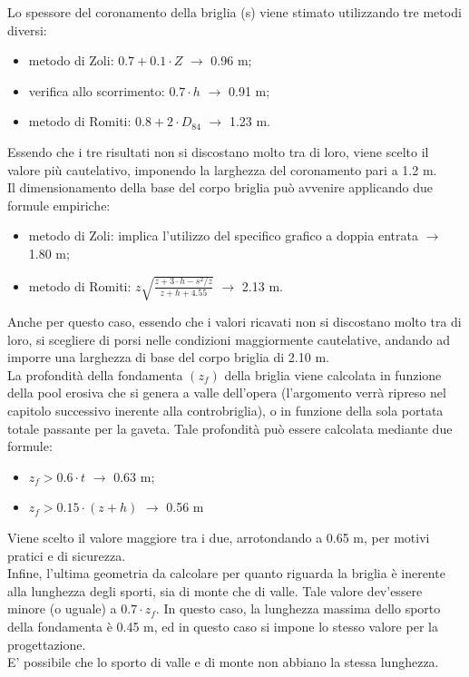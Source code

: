 Lo spessore del coronamento della briglia (s) viene stimato utilizzando tre metodi diversi:
\begin{itemize}
    \item metodo di Zoli: $0.7 + 0.1 \cdot Z$ $\rightarrow$ 0.96 m;
    \item verifica allo scorrimento: $0.7 \cdot h$ $\rightarrow$ 0.91 m;
    \item metodo di Romiti: $0.8 + 2 \cdot D_{84}$ $\rightarrow$ 1.23 m.
\end{itemize}
Essendo che i tre risultati non si discostano molto tra di loro, viene scelto il valore più cautelativo, imponendo la larghezza del coronamento pari a 1.2 m.\\
Il dimensionamento della base del corpo briglia può avvenire applicando due formule empiriche:
\begin{itemize}
    \item metodo di Zoli: implica l'utilizzo del specifico grafico a doppia entrata $\rightarrow$ 1.80 m;
    \item metodo di Romiti: $z \sqrt{\frac{z+3 \cdot h-s^2/z}{z+h+4.55}}$ $\rightarrow$ 2.13 m.
\end{itemize}
Anche per questo caso, essendo che i valori ricavati non si discostano molto tra di loro, si scegliere di porsi nelle condizioni maggiormente cautelative, andando ad imporre una larghezza di base del corpo briglia di 2.10 m.\\
La profondità della fondamenta $(z_f)$ della briglia viene calcolata in funzione della pool erosiva che si genera a valle dell'opera (l'argomento verrà ripreso nel capitolo successivo inerente alla controbriglia), o in funzione della sola portata totale passante per la gaveta. Tale profondità può essere calcolata mediante due formule:
\begin{itemize}
    \item $z_f > 0.6 \cdot t$ $\rightarrow$ 0.63 m;
    \item $z_f > 0.15 \cdot (z+h)$ $\rightarrow$ 0.56 m
\end{itemize}
Viene scelto il valore maggiore tra i due, arrotondando a 0.65 m, per motivi pratici e di sicurezza.\\
Infine, l'ultima geometria da calcolare per quanto riguarda la briglia è inerente alla lunghezza degli sporti, sia di monte che di valle. Tale valore dev'essere minore (o uguale) a $0.7 \cdot z_f$. In questo caso, la lunghezza massima dello sporto della fondamenta è 0.45 m, ed in questo caso si impone lo stesso valore per la progettazione.\\
E' possibile che lo sporto di valle e di monte non abbiano la stessa lunghezza. 

